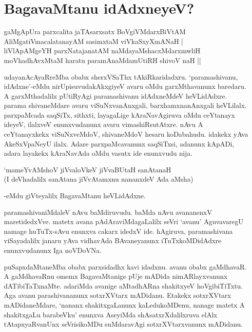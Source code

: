 \chapter{BagavaMtanu idAdxneyeV?}\label{chap8}

\begin{shloka}
gaMgApUra parxcalita jaTAsarxsatx BoVgiVMdarxBiVtAM\\
AliMgatiVmacalatanayAM sasimxtaM viVkaSxyXmANaH |\\
liVlApAMgeYH parxNatajanatAM naMdayaMshacxMdarxmwliH\\
moVhadhAvxMtaM haratu paramAnaMdamUtiRH shivoV naH‌ ||
\end{shloka}

udayanAcAyaRreMba obabx sherxVSaThx tAkiRkaridadxru. `paramashivanu, idAdxne'-eMdu nirUpisuvudakAkxgiyeV avaru oMdu garxMthavanunx baredaru. A garxMthadalilx pUtiRyAgi paramashivanu idAdxneMdeV heVLidAdxre. parama shivaneMdare avaru viSuNxvanAnxgali, barxhamxnanAnxgali heVLilalx. parxpaMcada saqSiTx, sithxti, layagaLige kAraNavAgiruva oMdu ceYtanayx ideyeV, ilalxveV enunxvudanunx avaru vimashiRsutAtxre. nAvu A ceYtanayxkekx viSuNxveMdoV, shivaneMdoV hesaru koDabahudu. idakekx yAva AkeSxVpaNeyU ilalx. Adare parxpaMcavanunx saqSiTxsi, adanunx kApADi, adara layakekx kAraNavAda oMdu vasutx ide enunxvudu nija.

\begin{shloka}
`mameYvAMshoV jiVvaloVkeV jiVvaBUtaH sanAtanaH\\
(I deVhadalilx sanAtana jiVvAtamxnu nananxdeV Ada aMsha)
\end{shloka}

-eMdu giVteyalilx BagavaMtanu heVLidAdxne.

paramashivaniMdaleV nAvu baMdiruvudu. baMda nAvu avananenxV maretidedxVve. matetx avana pAdAraviMdagaLalilx seVri `avanu' AguvavaregU namage huTuTx-sAvu enunxva cakarx idedxV ide. hAgiruva, paramashivana viSayadalilx janaru yAva vidhavAda BAvaneyanunx iTuTxkoMDidAdxre enunxvudanunx Iga noVDoVNa.

puSapxdaMtaneMba obabx parxsidadhx kavi idadxnu. avanu obabx gaMdhavaR. A gaMdhavaRnu omemx BagavaMtanige pUje mADida nimARlayxvanunx dATibiTaTxnaMte. adariMda avanige aMtadhARna shakitxyeV hoVgibiTiTxtu. Aga avanu parashivananunx sotxrXVtarx mADidanu. Etakekx sotxrXVtarx mADidaneMdare, `nananx shakitxgaLanunx kaLedukoMDenu, nanage matetx A shakitxgaLu barabeVku' enunxva AseyiMda shAsatxrXdalilxruva elAlx tAtapxyaRvanUnx seVrisikoMDu suMdaravAgi sotxrXVtarxvanunx mADidanu.

